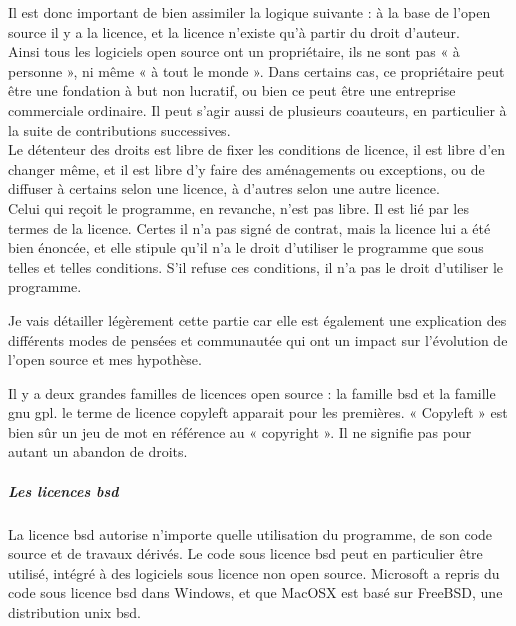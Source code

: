 					Il est donc important de bien assimiler la logique suivante : à la base de l'open source il y a la licence, et la licence n'existe qu'à partir du droit d'auteur.\\

					Ainsi tous les logiciels open source ont un propriétaire, ils ne sont pas « à personne », ni même « à tout le monde ». Dans certains cas, ce propriétaire peut être une fondation à but non lucratif, ou bien ce peut être une entreprise commerciale ordinaire. Il peut s'agir aussi de plusieurs coauteurs, en particulier à la suite de contributions successives.\\

					Le détenteur des droits est libre de fixer les conditions de licence, il est libre d'en changer même, et il est libre d'y faire des aménagements ou exceptions, ou de diffuser à certains selon une licence, à d'autres selon une autre licence.\\

					Celui qui reçoit le programme, en revanche, n'est pas libre. Il est lié par les termes de la licence. Certes il n'a pas signé de contrat, mais la licence lui a été bien énoncée, et elle stipule qu'il n'a le droit d'utiliser le programme que sous telles et telles conditions. S'il refuse ces conditions, il n'a pas le droit d'utiliser le programme. 

					Je vais détailler légèrement cette partie car elle est également une explication des différents modes de pensées et communautée qui ont un impact sur l'évolution de l'open source et mes hypothèse.

					Il y a deux grandes familles de licences open source : la famille \acrshort{bsd} et la famille \acrshort{gnu gpl}. le terme de licence copyleft apparait pour les premières. « Copyleft » est bien sûr un jeu de mot en référence au « copyright ». Il ne signifie pas pour autant un abandon de droits.\\

					\subparagraph{Les licences \acrshort{bsd}\\}

						La licence \acrfull{bsd} autorise n'importe quelle utilisation du programme, de son code source et de travaux dérivés. Le code sous licence \acrshort{bsd} peut en particulier être utilisé, intégré à des logiciels sous licence non open source. Microsoft a repris du code sous licence \acrshort{bsd} dans Windows, et que MacOSX est basé sur FreeBSD, une distribution unix \acrshort{bsd}.\\

